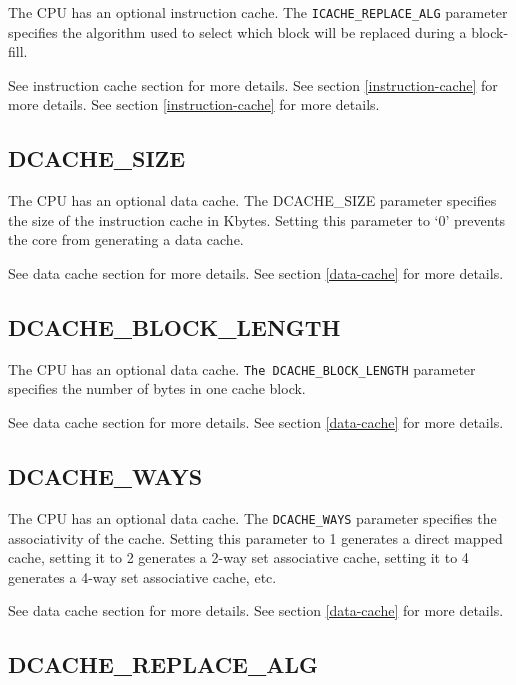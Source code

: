 The CPU has an optional instruction cache. The \texttt{ICACHE\_REPLACE\_ALG}
parameter specifies the algorithm used to select which block will be
replaced during a block-fill.

\ifdefined\MARKDOWN
See instruction cache section for more details.
\else
See section \ref{instruction-cache}  for more details.
\fi
See section \ref{instruction-cache}  for more details.

\subsection{DCACHE\_SIZE}\label{dcache_size}

The CPU has an optional data cache. The DCACHE\_SIZE parameter specifies the
size of the instruction cache in Kbytes. Setting this parameter to `0' prevents
the core from generating a data cache.

\ifdefined\MARKDOWN
See data cache section for more details.
\else
See section \ref{data-cache}  for more details.
\fi

\subsection{DCACHE\_BLOCK\_LENGTH}\label{dcache_block_length}

The CPU has an optional data cache. \texttt{The DCACHE\_BLOCK\_LENGTH} parameter
specifies the number of bytes in one cache block.

\ifdefined\MARKDOWN
See data cache section for more details.
\else
See section \ref{data-cache}  for more details.
\fi

\subsection{DCACHE\_WAYS}\label{dcache_ways}

The CPU has an optional data cache. The \texttt{DCACHE\_WAYS} parameter
specifies the associativity of the cache. Setting this parameter to 1 generates
a direct mapped cache, setting it to 2 generates a 2-way set associative cache,
setting it to 4 generates a 4-way set associative cache, etc.

\ifdefined\MARKDOWN
See data cache section for more details.
\else
See section \ref{data-cache}  for more details.
\fi

\subsection{DCACHE\_REPLACE\_ALG}\label{dcache_replace_alg}

